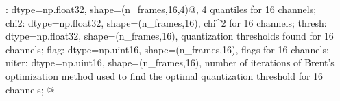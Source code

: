\documentclass[letterpaper,twoside,12pt]{article}
\begin{document}
\verb@quantl: dtype=np.float32, shape=(n_frames,16,4)@, 4 quantiles for 16 channels; \\
chi2:   dtype=np.float32, shape=(n_frames,16), chi^2 for 16 channels;
thresh: dtype=np.float32, shape=(n_frames,16), quantization thresholds found
        for 16 channels;
flag:   dtype=np.uint16, shape=(n_frames,16), flags for 16 channels; 
niter:  dtype=np.uint16, shape=(n_frames,16), number of iterations of Brent's
        optimization method used to find the optimal quantization threshold
        for 16 channels;
@
%
%   
%   
%
%
%
%
%
%
%
%
%
%
%
%
%
%
%
%
%
%
%
%
%
%
%
%
%
%
\end{document}
